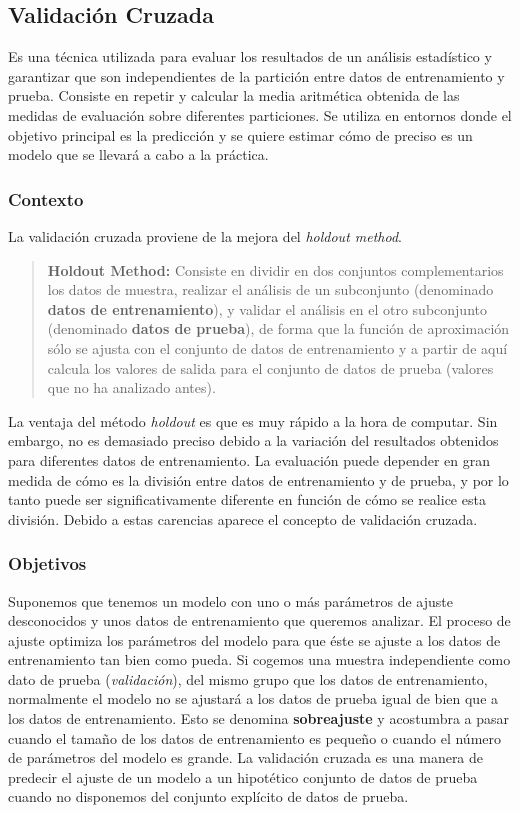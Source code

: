 \documentclass[10pt,a4paper]{article}
\begin{document}
\subsection{Validación Cruzada}

Es una técnica utilizada para evaluar los resultados de un análisis estadístico y garantizar que son independientes de la partición entre datos de entrenamiento y prueba. Consiste en repetir y calcular la media aritmética obtenida de las medidas de evaluación sobre diferentes particiones. Se utiliza en entornos donde el objetivo principal es la predicción y se quiere estimar cómo de preciso es un modelo que se llevará a cabo a la práctica.

\subsubsection{Contexto}
La validación cruzada proviene de la mejora del \textit{holdout method}.
\begin{quote}
\textbf{Holdout Method:} Consiste en dividir en dos conjuntos complementarios los datos de muestra, realizar el análisis de un subconjunto (denominado \textbf{datos de entrenamiento}), y validar el análisis en el otro subconjunto (denominado \textbf{datos de prueba}), de forma que la función de aproximación sólo se ajusta con el conjunto de datos de entrenamiento y a partir de aquí calcula los valores de salida para el conjunto de datos de prueba (valores que no ha analizado antes).
\end{quote}
La ventaja del método \textit{holdout} es que es muy rápido a la hora de computar. Sin embargo, no es demasiado preciso debido a la variación del resultados obtenidos para diferentes datos de entrenamiento. La evaluación puede depender en gran medida de cómo es la división entre datos de entrenamiento y de prueba, y por lo tanto puede ser significativamente diferente en función de cómo se realice esta división. Debido a estas carencias aparece el concepto de validación cruzada.

\subsubsection{Objetivos}
Suponemos que tenemos un modelo con uno o más parámetros de ajuste desconocidos y unos datos de entrenamiento que queremos analizar. El proceso de ajuste optimiza los parámetros del modelo para que éste se ajuste a los datos de entrenamiento tan bien como pueda. Si cogemos una muestra independiente como dato de prueba (\textit{validación}), del mismo grupo que los datos de entrenamiento, normalmente el modelo no se ajustará a los datos de prueba igual de bien que a los datos de entrenamiento. Esto se denomina \textbf{sobreajuste} y acostumbra a pasar cuando el tamaño de los datos de entrenamiento es pequeño o cuando el número de parámetros del modelo es grande. La validación cruzada es una manera de predecir el ajuste de un modelo a un hipotético conjunto de datos de prueba cuando no disponemos del conjunto explícito de datos de prueba.
\end{document}
